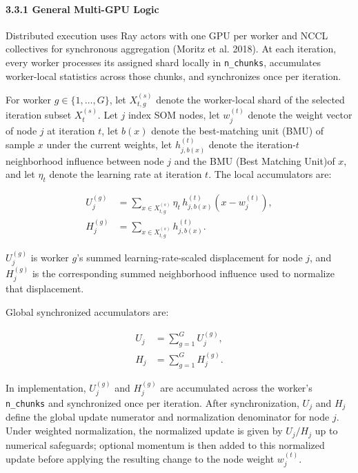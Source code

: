 \documentclass[
]{article}
\begin{document}
\paragraph{3.3.1 General Multi-GPU Logic}\label{general-multi-gpu-logic}

Distributed execution uses Ray actors with one GPU per worker and NCCL
collectives for synchronous aggregation (Moritz et al. 2018). At each
iteration, every worker processes its assigned shard locally in
\texttt{n\_chunks}, accumulates worker-local statistics across those
chunks, and synchronizes once per iteration.

For worker \(g \in \{1,\dots,G\}\), let \(X_{t,g}^{(s)}\) denote the
worker-local shard of the selected iteration subset \(X_t^{(s)}\). Let
\(j\) index SOM nodes, let \(w_j^{(t)}\) denote the weight vector of
node \(j\) at iteration \(t\), let \(b(x)\) denote the best-matching
unit (BMU) of sample \(x\) under the current weights, let
\(h_{j,b(x)}^{(t)}\) denote the iteration-\(t\) neighborhood influence
between node \(j\) and the BMU (Best Matching Unit)of \(x\), and let
\(\eta_t\) denote the learning rate at iteration \(t\). The local
accumulators are:

\[
\begin{aligned}
 U_j^{(g)} &= \sum_{x \in X_{t,g}^{(s)}} \eta_t\,h_{j,b(x)}^{(t)}(x-w_j^{(t)}), \\
 H_j^{(g)} &= \sum_{x \in X_{t,g}^{(s)}} h_{j,b(x)}^{(t)}.
\end{aligned}
\tag{3}
\]

\(U_j^{(g)}\) is worker \(g\)'s summed learning-rate-scaled displacement
for node \(j\), and \(H_j^{(g)}\) is the corresponding summed
neighborhood influence used to normalize that displacement.

Global synchronized accumulators are:

\[
\begin{aligned}
U_j &= \sum_{g=1}^{G} U_j^{(g)}, \\
H_j &= \sum_{g=1}^{G} H_j^{(g)}.
\end{aligned}
\tag{4}
\]

In implementation, \(U_j^{(g)}\) and \(H_j^{(g)}\) are accumulated
across the worker's \texttt{n\_chunks} and synchronized once per
iteration. After synchronization, \(U_j\) and \(H_j\) define the global
update numerator and normalization denominator for node \(j\). Under
weighted normalization, the normalized update is given by \(U_j/H_j\) up
to numerical safeguards; optional momentum is then added to this
normalized update before applying the resulting change to the node
weight \(w_j^{(t)}\).
\end{document}
